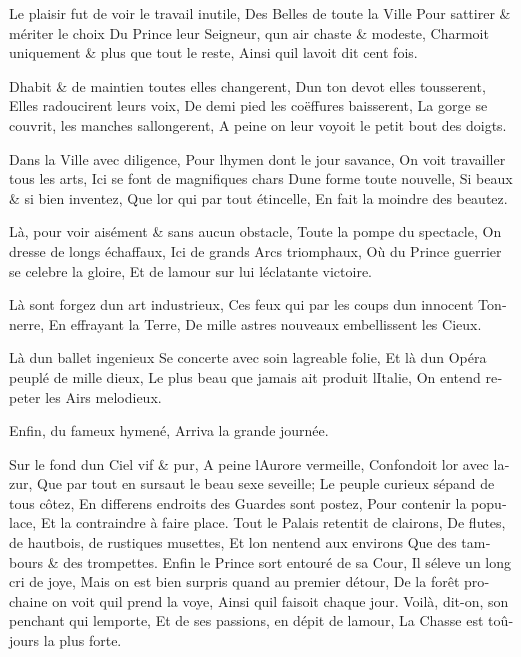 \documentclass[14pt,a4paper]{memoir}
\begin{document}
{{\begin{otherlanguage}{french}
{Le plaisir fut de voir le travail inutile,} {Des Belles de toute la
Ville} {Pour s\textquotesingle attirer \& mériter le choix} {Du Prince
leur Seigneur, q\textquotesingle un air chaste \& modeste,} {Charmoit
uniquement \& plus que tout le reste, } {Ainsi qu\textquotesingle il
l\textquotesingle avoit dit cent fois.}

{D\textquotesingle habit \& de maintien toutes elles changerent,}
{D\textquotesingle un ton devot elles tousserent,} {Elles radoucirent
leurs voix,} {De demi pied les coëffures baisserent,} {La gorge se
couvrit, les manches s\textquotesingle allongerent, } {A peine on leur
voyoit le petit bout des doigts. }

{Dans la Ville avec diligence,} {Pour l\textquotesingle hymen dont le
jour s\textquotesingle avance,} {On voit travailler tous les arts,} {Ici
se font de magnifiques chars} {D\textquotesingle une forme toute
nouvelle,} {Si beaux \& si bien inventez,} {Que l\textquotesingle or qui
par tout étincelle,} {En fait la moindre des beautez.}

{Là, pour voir aisément \& sans aucun obstacle, } {Toute la pompe du
spectacle,} {On dresse de longs échaffaux,} {Ici de grands Arcs
triomphaux,} {Où du Prince guerrier se celebre la gloire,} {Et de
l\textquotesingle amour sur lui l\textquotesingle éclatante victoire.}

{Là sont forgez d\textquotesingle un art industrieux,} {Ces feux qui par
les coups d\textquotesingle un innocent Tonnerre,} {En effrayant la
Terre,} {De mille astres nouveaux embellissent les Cieux. }

{Là d\textquotesingle un ballet ingenieux} {Se concerte avec soin
l\textquotesingle agreable folie,} {Et là d\textquotesingle un Opéra
peuplé de mille dieux,} {Le plus beau que jamais ait produit
l\textquotesingle Italie,} {On entend repeter les Airs melodieux.}

{Enfin, du fameux hymené,} {Arriva la grande journée.}

{Sur le fond d\textquotesingle un Ciel vif \& pur,} {A peine
l\textquotesingle Aurore vermeille,} {Confondoit l\textquotesingle or
avec l\textquotesingle azur,} {Que par tout en sursaut le beau sexe
s\textquotesingle eveille; } {Le peuple curieux s\textquotesingle épand
de tous côtez,} {En differens endroits des Guardes sont postez,} {Pour
contenir la populace,} {Et la contraindre à faire place.} {Tout le
Palais retentit de clairons,} {De flutes, de hautbois, de rustiques
musettes,} {Et l\textquotesingle on n\textquotesingle entend aux
environs} {Que des tambours \& des trompettes.} {Enfin le Prince sort
entouré de sa Cour,} {Il s\textquotesingle éleve un long cri de joye,}
{Mais on est bien surpris quand au premier détour, } {De la forêt
prochaine on voit qu\textquotesingle il prend la voye,} {Ainsi
qu\textquotesingle il faisoit chaque jour.} {Voilà, dit-on, son penchant
qui l\textquotesingle emporte,} {Et de ses passions, en dépit de
l\textquotesingle amour,} {La Chasse est toûjours la plus forte.}


\end{otherlanguage}}}
\end{document}
